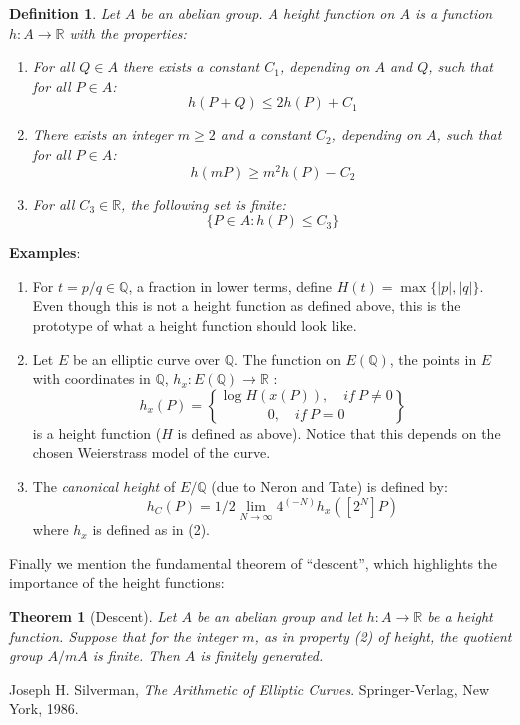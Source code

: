 \documentclass[12pt]{article}
\newtheorem{thm}{Theorem}
\newtheorem{defn}{Definition}
\begin{document}
\begin{defn}
Let $A$ be an abelian group. A height function on $A$ is a
function $h\colon A\to \mathbb{R}$ with the properties:
\begin{enumerate}
\item For all $Q\in A$ there exists a constant $C_1$, depending on
$A$ and $Q$, such that for all $P\in A$:
$$ h(P+Q)\leq 2h(P) +C_1$$
\item There exists an integer $m \geq 2$ and a constant $C_2$,
depending on $A$, such that for all $P\in A$:
$$ h(mP)\geq m^2h(P) -C_2$$
\item For all $C_3 \in \mathbb{R}$, the following set is finite:
$$\{ P\in A: h(P)\leq C_3\} $$
\end{enumerate}
\end{defn}

{\bf Examples}:
\begin{enumerate}
\item For $t=p/q \in \mathbb{Q}$, a fraction in lower terms,
define $H(t)=\max \{\mid p \mid ,\mid q \mid \}$. Even though this
is not a height function as defined above, this is the prototype
of what a height function should look like. \item Let $E$ be an
elliptic curve over $\mathbb{Q}$. The function on $E(\mathbb{Q})$,
the points in $E$ with coordinates in $\mathbb{Q}$,
$h_x\colon E(\mathbb{Q})\to \mathbb{R}$ :
$$h_x(P)={{\log H(x(P)),\quad if\ P\neq 0} \brace {0,\quad if\
P=0}}$$ is a height function ($H$ is defined as above). Notice that
this depends on the chosen Weierstrass model of the curve. \item
The \emph{canonical height} of $E/\mathbb{Q}$ (due to Neron and Tate)
is defined by:
$$h_C(P)=1/2 \lim_{N\to \infty} 4^{(-N)}h_x([2^N]P)$$
where $h_x$ is defined as in (2).
\end{enumerate}

Finally we mention the fundamental theorem of ``descent'', which
highlights the importance of the height functions:

\begin{thm}[Descent] Let $A$ be an abelian group and let $h\colon A \to
\mathbb{R}$ be a height function. Suppose that for the integer
$m$, as in property (2) of height, the quotient group $A/mA$ is
finite. Then $A$ is finitely generated.
\end{thm}

\begin{thebibliography}{9}
 Joseph H. Silverman, {\em The Arithmetic of Elliptic Curves}. Springer-Verlag, New York, 1986.
\end{thebibliography}
\end{document}
